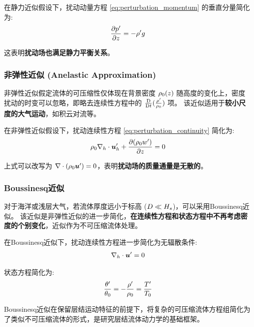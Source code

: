 在静力近似假设下，扰动动量方程 \eqref{eq:perturbation_momentum} 的垂直分量简化为:
\begin{equation}
    \pde{\pressure^\prime}{z} = -\density^\prime \gravityconst
    \label{eq:hydrostatic_approx}
\end{equation}

这表明\textbf{扰动场也满足静力平衡关系}。

\subsubsection{非弹性近似 (Anelastic Approximation)}

非弹性近似假定流体的可压缩性仅体现在背景密度 $\rho_0(z)$ 随高度的变化上，密度扰动的时变可以忽略，即略去连续性方程中的 $\frac{\mathrm{D} }{\mathrm{D} t}(\frac{\rho^\prime}{\rho_0})$ 项。
该近似适用于\textbf{较小尺度的大气运动}，如积云对流等。

在非弹性近似假设下，扰动连续性方程 \eqref{eq:perturbation_continuity} 简化为:
\begin{equation}
    \density_0 \nabla_h \cdot \vel_h^\prime + \pde{(\density_0 w^\prime)}{z} = 0
    \label{eq:anelastic_continuity}
\end{equation}

上式可以改写为 $\nabla \cdot (\rho_0 \bm{u}^\prime) = 0$，表明\textbf{扰动场的质量通量是无散的}。

\subsubsection{Boussinesq近似}

对于海洋或浅层大气，若流体厚度远小于标高 ($D \ll H_s$)，可以采用Boussinesq近似。
该近似是非弹性近似的进一步简化，\textbf{在连续性方程和状态方程中不再考虑密度的个别变化}，近似作为不可压缩流体处理。

在Boussinesq近似下，扰动连续性方程进一步简化为无辐散条件:
\begin{equation}
    \nabla_h \cdot \bm{u}^\prime = 0
    \label{eq:boussinesq_continuity}
\end{equation}

状态方程简化为:
\begin{equation}
    \frac{\theta^\prime}{\theta_0} = -\frac{\rho^\prime}{\rho_0} = \frac{T^\prime}{T_0}
    \label{eq:boussinesq_state}
\end{equation}

Boussinesq近似在保留层结运动特征的前提下，将复杂的可压缩流体方程组简化为了类似不可压缩流体的形式，是研究层结流体动力学的基础框架。

